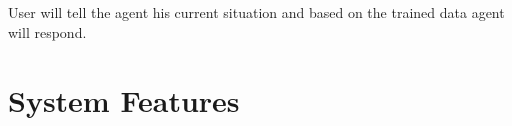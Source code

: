 \documentclass{scrreprt}
\begin{document}


User will tell the agent his current situation and based on the trained data agent will respond.





\chapter{System Features}
\end{document}
